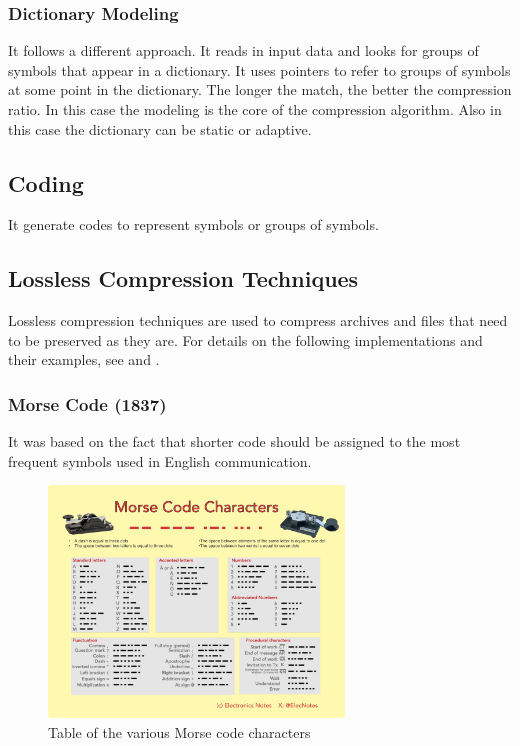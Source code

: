 \documentclass[12pt, a4paper]{report}
\begin{document}
\subsubsection{Dictionary Modeling}

It follows a different approach.
It reads in input data and looks for groups of symbols that appear in a dictionary.
It uses pointers to refer to groups of symbols at some point in the dictionary.
The longer the match, the better the compression ratio.
In this case the modeling is the core of the compression algorithm.
Also in this case the dictionary can be static or adaptive.

\subsection{Coding}

It generate codes to represent symbols or groups of symbols.

\subsection{Lossless Compression Techniques}

Lossless compression techniques are used to compress archives and files that need to be preserved as they are.
For details on the following implementations and their examples, see \cite{TheDataCompressionBook2ndEdition} and
\cite{IntroductionToDataCompression}.

\subsubsection{Morse Code (1837)}

It was based on the fact that shorter code should be assigned to the most frequent symbols used in English communication.

\begin{figure}[H]
  \centering
  \includegraphics[width=0.7\textwidth]{morse-code-characters-infographic}
  \caption{Table of the various Morse code characters}
  \label{fig:morse_code_pdf}
\end{figure}
\end{document}

